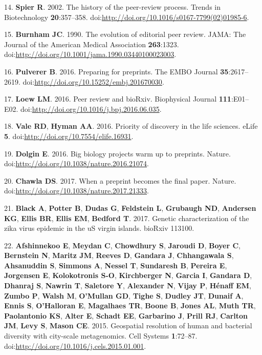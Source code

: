 \documentclass[11pt,]{article}
\begin{document}
14. \textbf{Spier R}. 2002. The history of the peer-review process.
Trends in Biotechnology \textbf{20}:357--358.
doi:\url{http://doi.org/10.1016/s0167-7799(02)01985-6}.

15. \textbf{Burnham JC}. 1990. The evolution of editorial peer review.
JAMA: The Journal of the American Medical Association \textbf{263}:1323.
doi:\url{http://doi.org/10.1001/jama.1990.03440100023003}.

16. \textbf{Pulverer B}. 2016. Preparing for preprints. The EMBO Journal
\textbf{35}:2617--2619.
doi:\url{http://doi.org/10.15252/embj.201670030}.

17. \textbf{Loew LM}. 2016. Peer review and bioRxiv. Biophysical Journal
\textbf{111}:E01--E02.
doi:\url{http://doi.org/10.1016/j.bpj.2016.06.035}.

18. \textbf{Vale RD}, \textbf{Hyman AA}. 2016. Priority of discovery in
the life sciences. eLife \textbf{5}.
doi:\url{http://doi.org/10.7554/elife.16931}.

19. \textbf{Dolgin E}. 2016. Big biology projects warm up to preprints.
Nature. doi:\url{http://doi.org/10.1038/nature.2016.21074}.

20. \textbf{Chawla DS}. 2017. When a preprint becomes the final paper.
Nature. doi:\url{http://doi.org/10.1038/nature.2017.21333}.

21. \textbf{Black A}, \textbf{Potter B}, \textbf{Dudas G},
\textbf{Feldstein L}, \textbf{Grubaugh ND}, \textbf{Andersen KG},
\textbf{Ellis BR}, \textbf{Ellis EM}, \textbf{Bedford T}. 2017. Genetic
characterization of the zika virus epidemic in the uS virgin islands.
bioRxiv 113100.

22. \textbf{Afshinnekoo E}, \textbf{Meydan C}, \textbf{Chowdhury S},
\textbf{Jaroudi D}, \textbf{Boyer C}, \textbf{Bernstein N},
\textbf{Maritz JM}, \textbf{Reeves D}, \textbf{Gandara J},
\textbf{Chhangawala S}, \textbf{Ahsanuddin S}, \textbf{Simmons A},
\textbf{Nessel T}, \textbf{Sundaresh B}, \textbf{Pereira E},
\textbf{Jorgensen E}, \textbf{Kolokotronis S-O}, \textbf{Kirchberger N},
\textbf{Garcia I}, \textbf{Gandara D}, \textbf{Dhanraj S},
\textbf{Nawrin T}, \textbf{Saletore Y}, \textbf{Alexander N},
\textbf{Vijay P}, \textbf{Hénaff EM}, \textbf{Zumbo P}, \textbf{Walsh
M}, \textbf{O'Mullan GD}, \textbf{Tighe S}, \textbf{Dudley JT},
\textbf{Dunaif A}, \textbf{Ennis S}, \textbf{O'Halloran E},
\textbf{Magalhaes TR}, \textbf{Boone B}, \textbf{Jones AL}, \textbf{Muth
TR}, \textbf{Paolantonio KS}, \textbf{Alter E}, \textbf{Schadt EE},
\textbf{Garbarino J}, \textbf{Prill RJ}, \textbf{Carlton JM},
\textbf{Levy S}, \textbf{Mason CE}. 2015. Geospatial resolution of human
and bacterial diversity with city-scale metagenomics. Cell Systems
\textbf{1}:72--87. doi:\url{http://doi.org/10.1016/j.cels.2015.01.001}.
\end{document}

